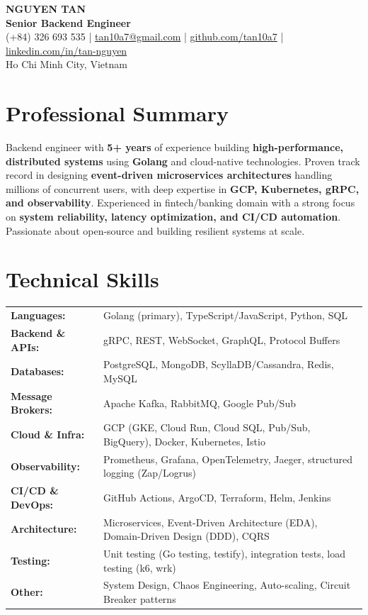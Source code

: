 \documentclass[a4paper,11pt]{article}
\begin{document}
\begin{center}
  {\Huge\textbf{NGUYEN TAN}} \\[8pt]
  {\large\textbf{Senior Backend Engineer}} \\[6pt]
  \small
  (+84) 326 693 535 \quad|\quad
  \href{mailto:tan10a7@gmail.com}{tan10a7@gmail.com} \quad|\quad
  \href{https://github.com/tan10a7}{github.com/tan10a7} \quad|\quad
  \href{https://linkedin.com/in/tan-nguyen}{linkedin.com/in/tan-nguyen} \\[2pt]
  Ho Chi Minh City, Vietnam
\end{center}

\section{Professional Summary}
Backend engineer with \textbf{5+ years} of experience building \textbf{high-performance, distributed systems} using \textbf{Golang} and cloud-native technologies. Proven track record in designing \textbf{event-driven microservices architectures} handling millions of concurrent users, with deep expertise in \textbf{GCP, Kubernetes, gRPC, and observability}. Experienced in fintech/banking domain with a strong focus on \textbf{system reliability, latency optimization, and CI/CD automation}. Passionate about open-source and building resilient systems at scale.

\section{Technical Skills}
\begin{tabularx}{\textwidth}{@{}l X@{}}
  \textbf{Languages:} & Golang (primary), TypeScript/JavaScript, Python, SQL \\
  \textbf{Backend \& APIs:} & gRPC, REST, WebSocket, GraphQL, Protocol Buffers \\
  \textbf{Databases:} & PostgreSQL, MongoDB, ScyllaDB/Cassandra, Redis, MySQL \\
  \textbf{Message Brokers:} & Apache Kafka, RabbitMQ, Google Pub/Sub \\
  \textbf{Cloud \& Infra:} & GCP (GKE, Cloud Run, Cloud SQL, Pub/Sub, BigQuery), Docker, Kubernetes, Istio \\
  \textbf{Observability:} & Prometheus, Grafana, OpenTelemetry, Jaeger, structured logging (Zap/Logrus) \\
  \textbf{CI/CD \& DevOps:} & GitHub Actions, ArgoCD, Terraform, Helm, Jenkins \\
  \textbf{Architecture:} & Microservices, Event-Driven Architecture (EDA), Domain-Driven Design (DDD), CQRS \\
  \textbf{Testing:} & Unit testing (Go testing, testify), integration tests, load testing (k6, wrk) \\
  \textbf{Other:} & System Design, Chaos Engineering, Auto-scaling, Circuit Breaker patterns \\
\end{tabularx}
\end{document}
